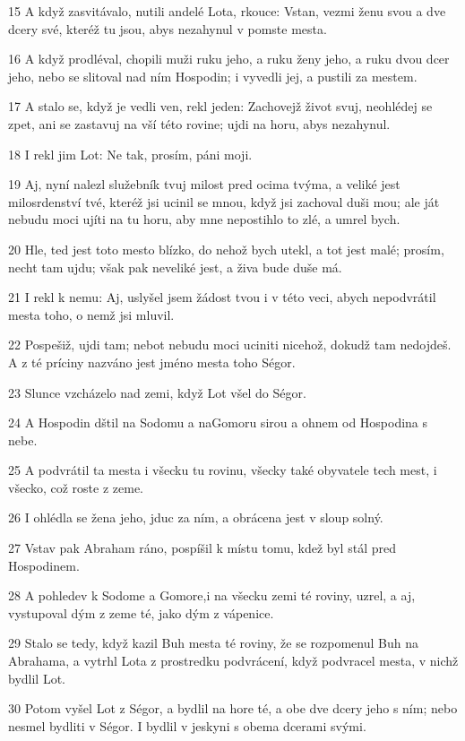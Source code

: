 \par 15 A když zasvitávalo, nutili andelé Lota, rkouce: Vstan, vezmi ženu svou a dve dcery své, kteréž tu jsou, abys nezahynul v pomste mesta.
\par 16 A když prodléval, chopili muži ruku jeho, a ruku ženy jeho, a ruku dvou dcer jeho, nebo se slitoval nad ním Hospodin; i vyvedli jej, a pustili za mestem.
\par 17 A stalo se, když je vedli ven, rekl jeden: Zachovejž život svuj, neohlédej se zpet, ani se zastavuj na vší této rovine; ujdi na horu, abys nezahynul.
\par 18 I rekl jim Lot: Ne tak, prosím, páni moji.
\par 19 Aj, nyní nalezl služebník tvuj milost pred ocima tvýma, a veliké jest milosrdenství tvé, kteréž jsi ucinil se mnou, když jsi zachoval duši mou; ale ját nebudu moci ujíti na tu horu, aby mne nepostihlo to zlé, a umrel bych.
\par 20 Hle, ted jest toto mesto blízko, do nehož bych utekl, a tot jest malé; prosím, necht tam ujdu; však pak neveliké jest, a živa bude duše má.
\par 21 I rekl k nemu: Aj, uslyšel jsem žádost tvou i v této veci, abych nepodvrátil mesta toho, o nemž jsi mluvil.
\par 22 Pospešiž, ujdi tam; nebot nebudu moci uciniti nicehož, dokudž tam nedojdeš. A z té príciny nazváno jest jméno mesta toho Ségor.
\par 23 Slunce vzcházelo nad zemi, když Lot všel do Ségor.
\par 24 A Hospodin dštil na Sodomu a naGomoru sirou a ohnem od Hospodina s nebe.
\par 25 A podvrátil ta mesta i všecku tu rovinu, všecky také obyvatele tech mest, i všecko, což roste z zeme.
\par 26 I ohlédla se žena jeho, jduc za ním, a obrácena jest v sloup solný.
\par 27 Vstav pak Abraham ráno, pospíšil k místu tomu, kdež byl stál pred Hospodinem.
\par 28 A pohledev k Sodome a Gomore,i na všecku zemi té roviny, uzrel, a aj, vystupoval dým z zeme té, jako dým z vápenice.
\par 29 Stalo se tedy, když kazil Buh mesta té roviny, že se rozpomenul Buh na Abrahama, a vytrhl Lota z prostredku podvrácení, když podvracel mesta, v nichž bydlil Lot.
\par 30 Potom vyšel Lot z Ségor, a bydlil na hore té, a obe dve dcery jeho s ním; nebo nesmel bydliti v Ségor. I bydlil v jeskyni s obema dcerami svými.
